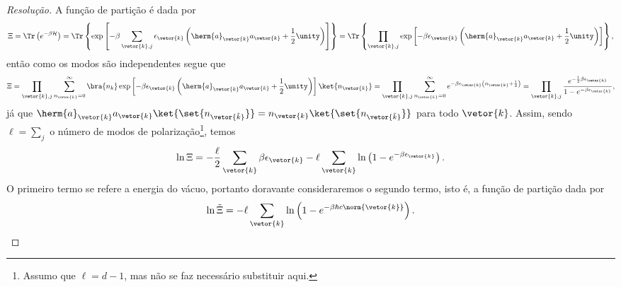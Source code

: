 \begin{proof}[Resolução]
    A função de partição é dada por
    \begin{equation*}
        \Xi = \Tr\left(e^{- \beta \mathcal{H}}\right) = \Tr\left\{\exp\left[- \beta \sum_{\vetor{k},j} \epsilon_{\vetor{k}}\left(\herm{a}_{\vetor{k}} a_{\vetor{k}} + \frac12\unity\right)\right]\right\} = \Tr\left\{\prod_{\vetor{k},j} \exp\left[- \beta \epsilon_{\vetor{k}} \left(\herm{a}_{\vetor{k}}a_{\vetor{k}}+ \frac12 \unity\right)\right]\right\},
    \end{equation*}
    então como os modos são independentes segue que
    \begin{equation*}
        \Xi = \prod_{\vetor{k},j} \sum_{n_{\vetor{k}} = 0}^\infty \bra{n_k}\exp\left[- \beta \epsilon_{\vetor{k}}\left(\herm{a}_{\vetor{k}}a_{\vetor{k}} + \frac12 \unity\right)\right]\ket{n_{\vetor{k}}} = \prod_{\vetor{k},j} \sum_{n_{\vetor{k}} = 0}^{\infty} e^{- \beta \epsilon_{\vetor{k}} \left(n_{\vetor{k}} + \frac12\right)} = \prod_{\vetor{k},j} \frac{e^{- \frac12\beta \epsilon_{\vetor{k}}}}{1 - e^{- \beta \epsilon_{\vetor{k}}}},
    \end{equation*}
    já que \(\herm{a}_{\vetor{k}}a_{\vetor{k}} \ket{\set{n_{\vetor{\tilde{k}}}}} = n_{\vetor{k}} \ket{\set{n_{\vetor{\tilde{k}}}}}\) para todo \(\vetor{k}\). Assim, sendo \(\ell = \sum_{j}\)  o número de modos de polarização\footnote{Assumo que \(\ell = d - 1\), mas não se faz necessário substituir aqui.}, temos
    \begin{equation*}
        \ln \Xi = -\frac\ell2 \sum_{\vetor{k}} \beta \epsilon_{\vetor{k}} -\ell \sum_{\vetor{k}} \ln\left(1 - e^{-\beta \epsilon_{\vetor{k}}}\right).
    \end{equation*}
    O primeiro termo se refere a energia do vácuo, portanto doravante consideraremos o segundo termo, isto é, a função de partição dada por
    \begin{equation*}
        \ln \tilde{\Xi} = - \ell\sum_{\vetor{k}} \ln\left(1 - e^{-\beta \hbar c \norm{\vetor{k}}}\right).
    \end{equation*}


\end{proof}
